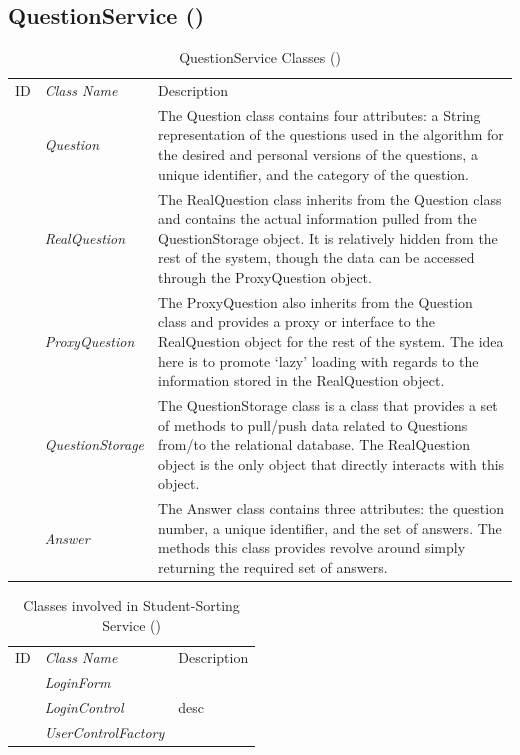 \documentclass[12pt,letterpaper]{article}
\begin{document}
\subsection{QuestionService ()}
\begin{table}[H]
	\caption{QuestionService Classes ()} 
	\begin{tabu} to 
	    \tableheader{}ID & Class Name & Description \\
		 & Question & The Question class contains four attributes: a String representation of the questions used in the algorithm for the desired and personal versions of the questions, a unique identifier, and the category of the question. \\
		 & RealQuestion & The RealQuestion class inherits from the Question class and contains the actual information pulled from the QuestionStorage object. It is relatively hidden from the rest of the system, though the data can be accessed through the ProxyQuestion object.\\
		 & ProxyQuestion & The ProxyQuestion also inherits from the Question class and provides a proxy or interface to the RealQuestion object for the rest of the system. The idea here is to promote `lazy' loading with regards to the information stored in the RealQuestion object.\\
		 & QuestionStorage & The QuestionStorage class is a class that provides a set of methods to pull/push data related to Questions from/to the relational database. The RealQuestion object is the only object that directly interacts with this object.\\
		 & Answer & The Answer class contains three attributes: the question number, a unique identifier, and the set of answers. The methods this class provides revolve around simply returning the required set of answers.\\
	\end{tabu}
\end{table}

\begin{table}[H]
    \caption{Classes involved in Student-Sorting Service ()} 
	\begin{tabu} to 
		\tableheader{}ID & Class Name & Description \\
		 & LoginForm & \\
		 & LoginControl & desc \\
		 & UserControlFactory & \\
	\end{tabu}
\end{table}
\end{document}
